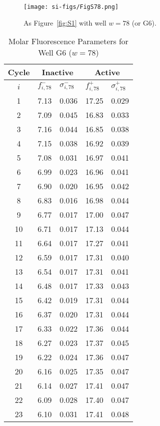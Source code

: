                 \begin{figure}
                    \centering
                    \texttt{[image: si-figs/FigS78.png]}
                    \caption{
                        As Figure~\ref{fig:S1} with well $w=78$ (or G6).
                    }
                \end{figure}
                \clearpage
    \begin{table}
        \caption{Molar Fluorescence Parameters for Well G6 ($w=78$)}
        \centering
        \begin{tabular}{c|ll|ll}
            Cycle & \multicolumn{2}{c|}{Inactive} & \multicolumn{2}{c}{Active} \\
            \hline
            $i$ & $f_{i,78}^{-}$ & $\sigma_{i,78}^{-}$ &  $f_{i,78}^{+}$ & $\sigma_{i,78}^{+}$ \\
            \hline
    1 & 7.13 & 0.036 & 17.25 & 0.029 \\
2 & 7.09 & 0.045 & 16.83 & 0.033 \\
3 & 7.16 & 0.044 & 16.85 & 0.038 \\
4 & 7.15 & 0.038 & 16.92 & 0.039 \\
5 & 7.08 & 0.031 & 16.97 & 0.041 \\
6 & 6.99 & 0.023 & 16.96 & 0.041 \\
7 & 6.90 & 0.020 & 16.95 & 0.042 \\
8 & 6.83 & 0.016 & 16.98 & 0.044 \\
9 & 6.77 & 0.017 & 17.00 & 0.047 \\
10 & 6.71 & 0.017 & 17.13 & 0.044 \\
11 & 6.64 & 0.017 & 17.27 & 0.041 \\
12 & 6.59 & 0.017 & 17.31 & 0.040 \\
13 & 6.54 & 0.017 & 17.31 & 0.041 \\
14 & 6.48 & 0.017 & 17.33 & 0.043 \\
15 & 6.42 & 0.019 & 17.31 & 0.044 \\
16 & 6.37 & 0.020 & 17.31 & 0.044 \\
17 & 6.33 & 0.022 & 17.36 & 0.044 \\
18 & 6.27 & 0.023 & 17.37 & 0.045 \\
19 & 6.22 & 0.024 & 17.36 & 0.047 \\
20 & 6.16 & 0.025 & 17.35 & 0.047 \\
21 & 6.14 & 0.027 & 17.41 & 0.047 \\
22 & 6.09 & 0.028 & 17.40 & 0.047 \\
23 & 6.10 & 0.031 & 17.41 & 0.048 \\

\end{tabular}
\end{table}
